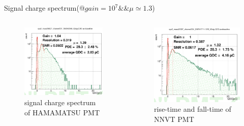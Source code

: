 \begin{frame}{Signal charge spectrum(@$gain=10^7\&\&\mu\simeq 1.3$)}
\begin{columns}
\begin{column}{.5\textwidth}
\begin{figure}
\centering
\includegraphics[width=\textwidth]{figures/hamcharge.png} %
\caption{signal charge spectrum of HAMAMATSU PMT}
\end{figure}
\end{column}
\begin{column}{.5\textwidth}
\begin{figure}
\centering
\includegraphics[width=\textwidth]{figures/mcpcharge.png} %
\caption{rise-time and fall-time of NNVT PMT}
\end{figure}
\end{column}
\end{columns}
\end{frame}
